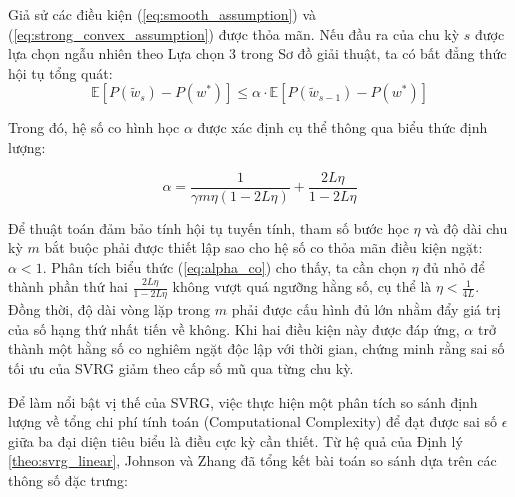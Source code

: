 \begin{theorem}\label{theo:svrg_linear}
Giả sử các điều kiện (\ref{eq:smooth_assumption}) và (\ref{eq:strong_convex_assumption}) được thỏa mãn. Nếu đầu ra của chu kỳ $s$ được lựa chọn ngẫu nhiên theo Lựa chọn 3 trong Sơ đồ giải thuật, ta có bất đẳng thức hội tụ tổng quát:
\begin{equation}
\mathbb{E} \left[ P(\tilde{w}_s) - P(w^*) \right] \le \alpha \cdot \mathbb{E} \left[ P(\tilde{w}_{s-1}) - P(w^*) \right]
\end{equation}

Trong đó, hệ số co hình học $\alpha$ được xác định cụ thể thông qua biểu thức định lượng:

\begin{equation}\label{eq:alpha_co}
\alpha = \frac{1}{\gamma m \eta (1 - 2L\eta)} + \frac{2L\eta}{1 - 2L\eta}
\end{equation}
\end{theorem}



Để thuật toán đảm bảo tính hội tụ tuyến tính, tham số bước học $\eta$ và độ dài chu kỳ $m$ bắt buộc phải được thiết lập sao cho hệ số co thỏa mãn điều kiện ngặt: $\alpha < 1$. Phân tích biểu thức (\ref{eq:alpha_co}) cho thấy, ta cần chọn $\eta$ đủ nhỏ để thành phần thứ hai $\frac{2L\eta}{1 - 2L\eta}$ không vượt quá ngưỡng hằng số, cụ thể là $\eta < \frac{1}{4L}$. Đồng thời, độ dài vòng lặp trong $m$ phải được cấu hình đủ lớn nhằm đẩy giá trị của số hạng thứ nhất tiến về không. Khi hai điều kiện này được đáp ứng, $\alpha$ trở thành một hằng số co nghiêm ngặt độc lập với thời gian, chứng minh rằng sai số tối ưu của SVRG giảm theo cấp số mũ qua từng chu kỳ.






Để làm nổi bật vị thế của SVRG, việc thực hiện một phân tích so sánh định lượng về tổng chi phí tính toán (Computational Complexity) để đạt được sai số $\epsilon$ giữa ba đại diện tiêu biểu là điều cực kỳ cần thiết. Từ hệ quả của Định lý \ref{theo:svrg_linear}, Johnson và Zhang \cite{johnson2013accelerating} đã tổng kết bài toán so sánh dựa trên các thông số đặc trưng:




